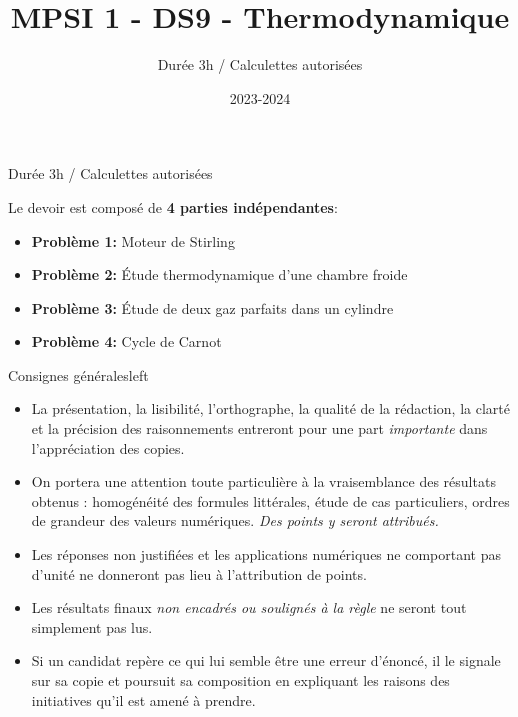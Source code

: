 \documentclass[
  10pt,
  french,
  a4paper,
  DIV=18]{scrartcl}
\title{MPSI 1 - DS9 - Thermodynamique}
\subtitle{Durée 3h / Calculettes autorisées}
\date{2023-2024}
\begin{document}
\begin{center}
  \begin{tcolorbox}[width=0.95\textwidth,colback=gray!10!white,colframe=gray!75!black]
    	
        \medskip
    {\large Durée 3h / Calculettes autorisées}
      \end{tcolorbox}
\end{center}




Le devoir est composé de \textbf{4 parties indépendantes}:

\begin{itemize}
\item
  \textbf{Problème 1:} Moteur de Stirling
\item
  \textbf{Problème 2:} Étude thermodynamique d'une chambre froide
\item
  \textbf{Problème 3:} Étude de deux gaz parfaits dans un cylindre
\item
  \textbf{Problème 4:} Cycle de Carnot
\end{itemize}

\begin{myexampleblock}{Consignes générales}{left}

\begin{itemize}
\item
  La présentation, la lisibilité, l'orthographe, la qualité de la
  rédaction, la clarté et la précision des raisonnements entreront pour
  une part \emph{importante} dans l'appréciation des copies.
\item
  On portera une attention toute particulière à la vraisemblance des
  résultats obtenus : homogénéité des formules littérales, étude de cas
  particuliers, ordres de grandeur des valeurs numériques. \emph{Des
  points y seront attribués.}
\item
  Les réponses non justifiées et les applications numériques ne
  comportant pas d'unité ne donneront pas lieu à l'attribution de
  points.
\item
  Les résultats finaux \emph{non encadrés ou soulignés à la règle} ne
  seront tout simplement pas lus.
\item
  Si un candidat repère ce qui lui semble être une erreur d'énoncé, il
  le signale sur sa copie et poursuit sa composition en expliquant les
  raisons des initiatives qu'il est amené à prendre.
\end{itemize}

\end{myexampleblock}
\end{document}
